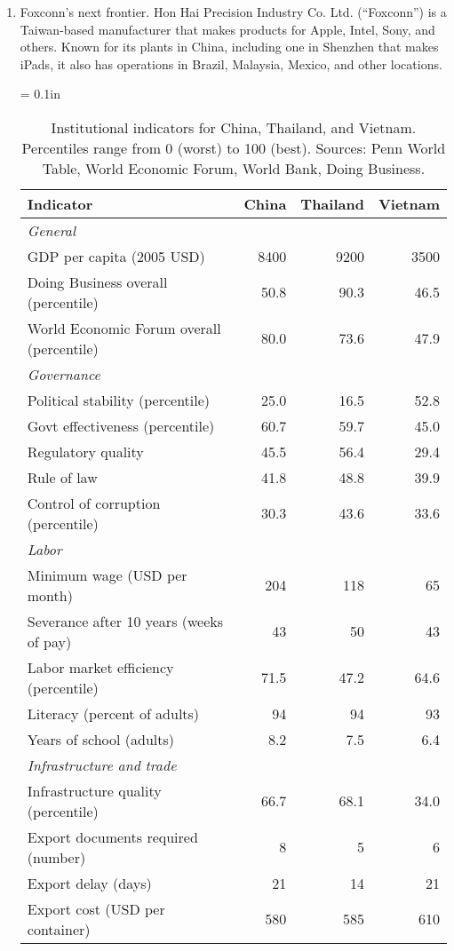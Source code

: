 \setlength{\leftmargini}{.5\oldleftmargini}
\begin{enumerate}
\item Foxconn's next frontier. 
Hon Hai Precision Industry Co. Ltd. (``Foxconn'') is a Taiwan-based manufacturer that makes
products for Apple, Intel, Sony, and others.
Known for its plants in China, including one in Shenzhen that makes iPads,
it also has operations in Brazil, Malaysia, Mexico, and other locations.


\begin{table}[h]
\centering
\tabcolsep = 0.1in
\begin{tabular}{lrrr}
\toprule
Indicator & China & Thailand & Vietnam \\
\midrule
\multicolumn{2}{l}{\it General} \\
GDP per capita  (2005 USD) &  8400 & 9200 & 3500  \\
Doing Business overall (percentile) & 50.8  &90.3 & 46.5 \\
World Economic Forum overall (percentile) & 80.0 & 73.6 & 47.9\\
\midrule
\multicolumn{2}{l}{\it Governance} \\
Political stability (percentile)  &  25.0 & 16.5 & 52.8 \\
Govt effectiveness (percentile)   &  60.7 & 59.7 & 45.0 \\
Regulatory quality                & 45.5  & 56.4 & 29.4\\
Rule of law                       & 41.8 & 48.8 & 39.9 \\
Control of corruption (percentile) & 30.3 & 43.6 & 33.6  \\
\midrule
\multicolumn{2}{l}{\it Labor} \\
Minimum wage (USD per month) &  204 & 118 & 65 \\
Severance after 10 years (weeks of pay) & 43 & 50 & 43 \\
Labor market efficiency (percentile) & 71.5 & 47.2 & 64.6 \\
Literacy (percent of adults)        & 94 & 94 & 93 \\
Years of school (adults)        & 8.2 & 7.5 & 6.4 \\
\midrule
\multicolumn{2}{l}{\it Infrastructure and trade} \\
Infrastructure quality (percentile)  & 66.7 & 68.1 & 34.0 \\
Export documents required (number) & 8 & 5 & 6\\
Export delay (days) &  21 & 14 & 21  \\
Export cost (USD per container) &  580 & 585 & 610 \\
\bottomrule
\end{tabular}
\caption{Institutional indicators for China, Thailand, and Vietnam.
Percentiles range from 0 (worst) to 100 (best).
Sources:  Penn World Table, World Economic Forum, World Bank, Doing Business.}
\label{tab:ctv}
\end{table}


\end{enumerate}
